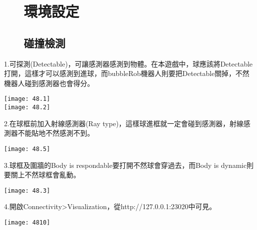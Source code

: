 \newpage
\begin{figure}[hbt!]
\chapter{環境設定}
\section{碰撞檢測}
\end{figure}
1.可探測(Detectable)，可讓感測器感測到物體。在本遊戲中，球應該將Detectable打開，這樣才可以感測到進球，而bubbleRob機器人則要把Detectable關掉，不然機器人碰到感測器也會得分。\
\begin{center}
\texttt{[image: 48.1]}\\
\texttt{[image: 48.2]}
\end{center}
\newpage
2.在球框前加入射線感測器(Ray type)，這樣球進框就一定會碰到感測器，射線感測器不能貼地不然感測不到。
\begin{center}
\texttt{[image: 48.5]}
\end{center}

3.球框及圍牆的Body is respondable要打開不然球會穿過去，而Body is dynamic則要關上不然球框會亂動。
\begin{center}
\texttt{[image: 48.3]}
\end{center}

4.開啟Connectivity>Visualization，從http://127.0.0.1:23020中可見。
\begin{center}
\texttt{[image: 4810]}
\end{center}